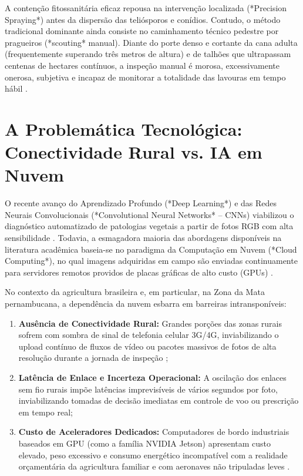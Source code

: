A contenção fitossanitária eficaz repousa na intervenção localizada (*Precision Spraying*) antes da dispersão das teliósporos e conídios. Contudo, o método tradicional dominante ainda consiste no caminhamento técnico pedestre por pragueiros (*scouting* manual). Diante do porte denso e cortante da cana adulta (frequentemente superando três metros de altura) e de talhões que ultrapassam centenas de hectares contínuos, a inspeção manual é morosa, excessivamente onerosa, subjetiva e incapaz de monitorar a totalidade das lavouras em tempo hábil \cite{radoglou2020compilation}.

\section{A Problemática Tecnológica: Conectividade Rural vs. IA em Nuvem}

O recente avanço do Aprendizado Profundo (*Deep Learning*) e das Redes Neurais Convolucionais (*Convolutional Neural Networks* -- CNNs) viabilizou o diagnóstico automatizado de patologias vegetais a partir de fotos RGB com alta sensibilidade \cite{krizhevsky2012,lu2022}. Todavia, a esmagadora maioria das abordagens disponíveis na literatura acadêmica baseia-se no paradigma da Computação em Nuvem (*Cloud Computing*), no qual imagens adquiridas em campo são enviadas continuamente para servidores remotos providos de placas gráficas de alto custo (GPUs) \cite{xu2023,rodriguez2021sugarcane}.

No contexto da agricultura brasileira e, em particular, na Zona da Mata pernambucana, a dependência da nuvem esbarra em barreiras intransponíveis:
\begin{enumerate}
    \item \textbf{Ausência de Conectividade Rural:} Grandes porções das zonas rurais sofrem com sombra de sinal de telefonia celular 3G/4G, inviabilizando o upload contínuo de fluxos de vídeo ou pacotes massivos de fotos de alta resolução durante a jornada de inspeção \cite{he2023};
    \item \textbf{Latência de Enlace e Incerteza Operacional:} A oscilação dos enlaces sem fio rurais impõe latências imprevisíveis de vários segundos por foto, inviabilizando tomadas de decisão imediatas em controle de voo ou prescrição em tempo real;
    \item \textbf{Custo de Aceleradores Dedicados:} Computadores de bordo industriais baseados em GPU (como a família NVIDIA Jetson) apresentam custo elevado, peso excessivo e consumo energético incompatível com a realidade orçamentária da agricultura familiar e com aeronaves não tripuladas leves \cite{oliveira2024}.
\end{enumerate}

